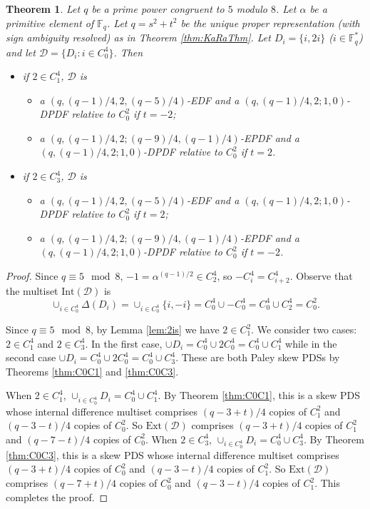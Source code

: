 \documentclass[12pt, a4paper]{article}
\newtheorem{theorem}{Theorem}[section]
\theoremstyle{definition}
\begin{document}
\begin{theorem}\label{thm:DPDFnotclasses}
Let $q$ be a prime power congruent to $5$ modulo $8$. Let $\alpha$ be a primitive element of $\mathbb{F}_q$. Let $q=s^2+t^2$ be the unique proper representation (with sign ambiguity resolved) as in Theorem \ref{thm:KaRaThm}. 
Let $D_i=\{i,2i\}$ ($i \in \mathbb{F}_q^*$) and let $\mathcal{D}=\{D_i: i \in C_0^4\}$.  Then 
\begin{itemize}
\item[(i)] if $2 \in C_1^4$, $\mathcal{D}$ is
\begin{itemize}
    \item a $(q,(q-1)/4,2,(q-5)/4)$-EDF and a $(q,(q-1)/4,2;1,0)$-DPDF relative to $C_0^2$ if $t=-2$;
    \item a $(q,(q-1)/4,2;(q-9)/4,(q-1)/4)$-EPDF and a $(q,(q-1)/4,2;1,0)$-DPDF relative to $C_0^2$ if $t=2$.
\end{itemize}
\item[(ii)] if $2 \in C_3^4$, $\mathcal{D}$ is
\begin{itemize}
    \item a $(q,(q-1)/4,2,(q-5)/4)$-EDF and a $(q,(q-1)/4,2;1,0)$-DPDF relative to $C_0^2$ if $t=2$;
    \item a $(q,(q-1)/4,2;(q-9)/4,(q-1)/4)$-EPDF and a $(q,(q-1)/4,2;1,0)$-DPDF relative to $C_0^2$ if $t=-2$.
\end{itemize}
\end{itemize}
\end{theorem}
\begin{proof}
Since $q \equiv 5 \mod 8$, $-1=\alpha^{(q-1)/2} \in C_2^4$, so $-C_i^4=C_{i+2}^4$.  Observe that the multiset $\mathrm{Int}(\mathcal{D})$ is 
$$\cup_{i \in C_0^4} \Delta(D_i)=\cup_{i \in C_0^4} \{i,-i\}=C_0^4 \cup -C_0^4=C_0^4 \cup C_2^4=C_0^2.$$

Since $q \equiv 5 \mod 8$, by Lemma \ref{lem:2is} we have $2 \in C_1^2$.  We consider two cases: $2 \in C_1^4$ and $2 \in C_3^4$.  In the first case, $\cup D_i= C_0^4 \cup 2C_0^4=C_0^4 \cup C_1^4$ while in the second case $\cup D_i= C_0^4 \cup 2C_0^4=C_0^4 \cup C_3^4$.  These are both Paley skew PDSs by Theorems \ref{thm:C0C1} and \ref{thm:C0C3}.

When $2 \in C_1^4$, $\cup_{i \in C_0^4} D_i=C_0^4 \cup C_1^4$. 
By Theorem \ref{thm:C0C1}, this is a skew PDS whose internal difference multiset comprises $(q-3+t)/4$ copies of $C_1^2$ and $(q-3-t)/4$ copies of $C_0^2$.  So $\mathrm{Ext}(\mathcal{D})$ comprises $(q-3+t)/4$ copies of $C_1^2$ and $(q-7-t)/4$ copies of $C_0^2$.  When $2 \in C_3^4$, $\cup_{i \in C_0^4} D_i=C_0^4 \cup C_3^4$. By Theorem \ref{thm:C0C3}, this is a skew PDS whose internal difference multiset comprises $(q-3+t)/4$ copies of $C_0^2$ and $(q-3-t)/4$ copies of $C_1^2$.  So $\mathrm{Ext}(\mathcal{D})$ comprises $(q-7+t)/4$ copies of $C_0^2$ and $(q-3-t)/4$ copies of $C_1^2$.  This completes the proof.
\end{proof}
\end{document}
